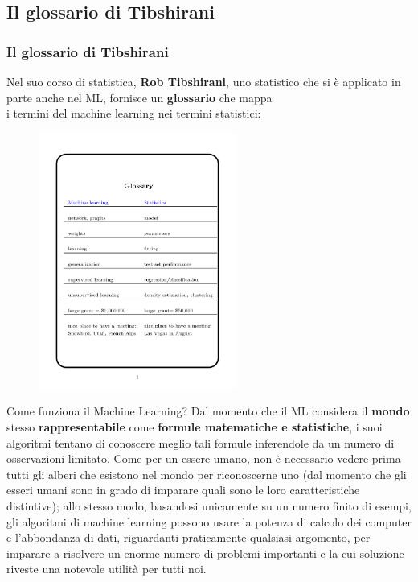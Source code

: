\subsection[Il glossario di Tibshirani]{Il glossario di Tibshirani}
\begin{frame}

	\frametitle{Il glossario di Tibshirani}

		Nel suo corso di statistica, \textbf{Rob Tibshirani}, uno statistico che si è applicato in parte anche nel ML, fornisce un \textbf{glossario} che mappa\\
		i termini del machine learning nei termini statistici:
		\begin{figure}[!htbp]
			\centering
			\includegraphics[width=6.5cm]{images/glossary/tibshirani_glossary.pdf}
		\end{figure}


\end{frame}


\begin{frame}

	\begin{block}{Come funziona il Machine Learning?}
		Dal momento che il ML considera il \textbf{mondo} stesso \textbf{rappresentabile} come \textbf{formule matematiche e statistiche}, i suoi algoritmi tentano di conoscere meglio tali formule inferendole da un numero di osservazioni limitato.
		\newlinedouble
		Come per un essere umano, non è necessario vedere prima tutti gli alberi che esistono nel mondo per riconoscerne uno (dal momento che gli esseri umani sono in grado di imparare quali sono le loro caratteristiche distintive); allo stesso modo, basandosi unicamente su un numero finito di esempi, gli algoritmi di machine learning possono usare la potenza di calcolo dei computer e l'abbondanza di dati, riguardanti praticamente qualsiasi argomento, per imparare a risolvere un enorme numero di problemi importanti e la cui soluzione riveste una notevole utilità per tutti noi.
		 \vskip5mm
		\hspace*{}
	\end{block}


\end{frame}


